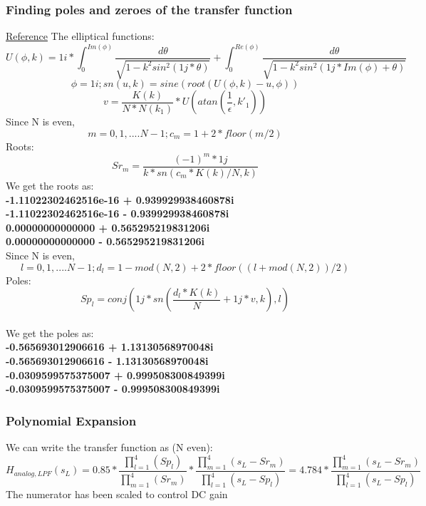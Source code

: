 \documentclass[12pt]{article}
\begin{document}
\subsubsection{Finding poles and zeroes of the transfer function}
\href{https://community.ptc.com/sejnu66972/attachments/sejnu66972/PTCMathcad/176201/1/13.2_Analog_Elliptic_Filter_Design.pdf}{Reference}
The elliptical functions:
\begin{equation}
    U(\phi,k)=1i*\int^{Im(\phi)}_0 \frac{d\theta}{\sqrt{1-k^2sin^2(1j*\theta)}}+\int^{Re(\phi)}_0 \frac{d\theta}{\sqrt{1-k^2sin^2(1j*Im(\phi)+\theta)}}
\end{equation}
\begin{equation}
    \phi=1i ; sn(u,k)=sine(root(U(\phi,k)-u,\phi))
\end{equation}
\begin{equation}
 v=\frac{K(k)}{N*N(k_1)}*U(atan(\frac{1}{\epsilon},k'_1))
\end{equation}
Since N is even,
\begin{equation}
m=0,1,....N-1; c_m=1+2*floor(m/2)
\end{equation}
Roots:
\begin{equation}
Sr_m=\frac{(-1)^m*1j}{k*sn(c_m*K(k)/N,k)}
\end{equation}
We get the roots as: \textbf{\\-1.11022302462516e-16 + 0.939929938460878i
\\-1.11022302462516e-16 - 0.939929938460878i
\\0.00000000000000 + 0.565295219831206i
\\0.00000000000000 - 0.565295219831206i}
\\Since N is even,
\begin{equation}
l=0,1,....N-1; d_l=1-mod(N,2)+2*floor((l+mod(N,2))/2)
\end{equation}
Poles:
\begin{equation}
Sp_l=conj(1j*sn(\frac{d_l*K(k)}{N}+1j*v,k),l)
\end{equation}
\\We get the poles as: \textbf{\\-0.565693012906616 + 1.13130568970048i
\\-0.565693012906616 - 1.13130568970048i
\\-0.0309599575375007 + 0.999508300849399i
\\-0.0309599575375007 - 0.999508300849399i}

\subsubsection{Polynomial Expansion}
We can write the transfer function as (N even):
\begin{equation}
    H_{analog,LPF}(s_L) = 0.85*\frac{\prod_{l=1}^{4}(Sp_l)}{\prod_{m=1}^{4}(Sr_m)}*\frac{\prod_{m=1}^{4}(s_L-Sr_m)}{\prod_{l=1}^{4}(s_L-Sp_l)} = 4.784*\frac{\prod_{m=1}^{4}(s_L-Sr_m)}{\prod_{l=1}^{4}(s_L-Sp_l)}
\end{equation}
The numerator has been scaled to control DC gain
\end{document}
